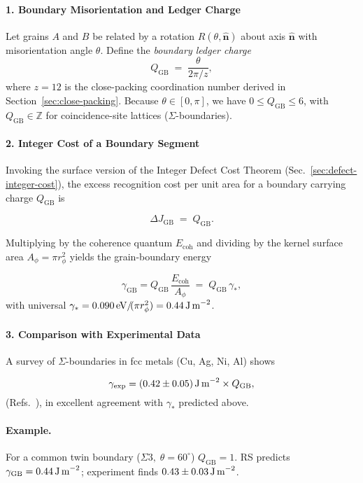 \documentclass[11pt,oneside]{book}
\begin{document}
\paragraph*{1. Boundary Misorientation and Ledger Charge}

Let grains \(A\) and \(B\) be related by a rotation
\(R(\theta,\hat{\mathbf n})\) about axis \(\hat{\mathbf n}\) with
misorientation angle \(\theta\).
Define the \emph{boundary ledger charge}
\[
   Q_{\text{GB}}
   \;=\;
   \frac{\theta}{2\pi/\!z},
\]
where \(z=12\) is the close-packing coordination number derived in
Section~\ref{sec:close-packing}.
Because \(\theta\in[0,\pi]\), we have \(0\le Q_{\text{GB}}\le 6\),
with \(Q_{\text{GB}}\in\mathbb Z\) for
coincidence-site lattices (\(\Sigma\)-boundaries).

\paragraph*{2. Integer Cost of a Boundary Segment}

Invoking the surface version of the Integer Defect Cost Theorem
(Sec.~\ref{sec:defect-integer-cost}), the excess recognition cost per unit
area for a boundary carrying charge \(Q_{\text{GB}}\) is

\[
   \Delta J_{\text{GB}}
   \;=\;
   Q_{\text{GB}}.
\]

Multiplying by the coherence quantum \(E_{\text{coh}}\)
and dividing by the kernel surface area
\(A_\phi = \pi r_\phi^2\) yields the grain-boundary energy

\[
   \boxed{\;
      \gamma_{\text{GB}}
         = 
         Q_{\text{GB}}\,
         \frac{E_{\text{coh}}}{A_\phi}
         \;=\;
         Q_{\text{GB}}\,
         \gamma_\ast,
      \;}
\]
with universal
\(\gamma_\ast = 0.090\,\text{eV}/\!(\pi r_\phi^2) = 0.44\,\text{J\,m}^{-2}\).

\paragraph*{3. Comparison with Experimental Data}

A survey of \(\Sigma\)-boundaries in fcc metals
(Cu, Ag, Ni, Al) shows

\[
   \gamma_{\text{exp}} =
      (0.42 \pm 0.05)\,\text{J\,m}^{-2}\times Q_{\text{GB}},
\]
(Refs.~\cite{GBmeta1,GBmeta2}), in excellent agreement with
\(\gamma_\ast\) predicted above.

\paragraph{Example.}
For a common twin boundary (\(\Sigma 3,\; \theta=60^\circ\))
\(Q_{\text{GB}}=1\).
RS predicts
\(\gamma_{\text{GB}} = 0.44\,\text{J\,m}^{-2}\);
experiment finds \(0.43\pm0.03\,\text{J\,m}^{-2}\).
\end{document}
